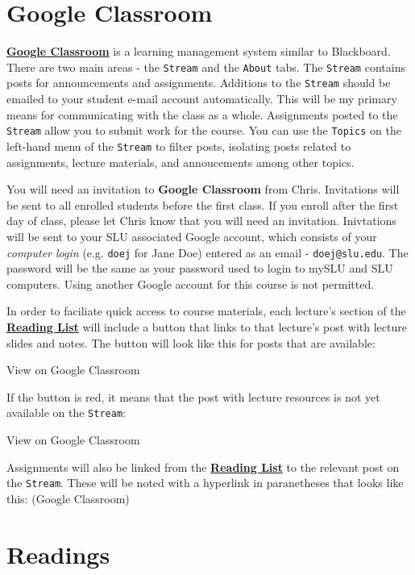 \documentclass[]{book}
\theoremstyle{definition}
\theoremstyle{definition}
\theoremstyle{definition}
\theoremstyle{remark}
\begin{document}
\hypertarget{google-classroom}{%
\section{Google Classroom}\label{google-classroom}}

\textbf{\href{https://classroom.google.com}{Google Classroom}} is a
learning management system similar to Blackboard. There are two main
areas - the \texttt{Stream} and the \texttt{About} tabs. The
\texttt{Stream} contains posts for announcements and assignments.
Additions to the \texttt{Stream} should be emailed to your student
e-mail account automatically. This will be my primary means for
communicating with the class as a whole. Assignments posted to the
\texttt{Stream} allow you to submit work for the course. You can use the
\texttt{Topics} on the left-hand menu of the \texttt{Stream} to filter
posts, isolating posts related to assignments, lecture materials, and
annoucements among other topics.

You will need an invitation to \textbf{Google Classroom} from Chris.
Invitations will be sent to all enrolled students before the first
class. If you enroll after the first day of class, please let Chris know
that you will need an invitation. Inivtations will be sent to your SLU
associated Google account, which consists of your \emph{computer login}
(e.g. \texttt{doej} for Jane Doe) entered as an email -
\texttt{doej@slu.edu}. The password will be the same as your password
used to login to mySLU and SLU computers. Using another Google account
for this course is not permitted.

In order to faciliate quick access to course materials, each lecture's
section of the \href{/lecture-schedule.html}{\textbf{Reading List}} will
include a button that links to that lecture's post with lecture slides
and notes. The button will look like this for posts that are available:

View on Google Classroom

If the button is red, it means that the post with lecture resources is
not yet available on the \texttt{Stream}:

View on Google Classroom

Assignments will also be linked from the
\href{/lecture-schedule.html}{\textbf{Reading List}} to the relevant
post on the \texttt{Stream}. These will be noted with a hyperlink in
paranetheses that looks like this: (Google Classroom)

\hypertarget{readings}{%
\section{Readings}\label{readings}}
\end{document}
